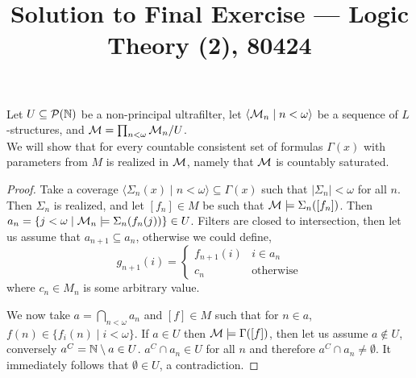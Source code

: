 
\title{Solution to Final Exercise --- Logic Theory (2), 80424}

\DeclareMathOperator{\PA}{PA}
\DeclareMathOperator{\Coll}{Coll}
\DeclareMathOperator{\Ind}{Ind}
\DeclareMathOperator{\Sat}{Sat}
\DeclareMathOperator{\pr}{Pr}
\DeclareMathOperator{\sent}{sent}
\DeclareMathOperator{\form}{form}
\DeclareMathOperator{\val}{Val}
\DeclareMathOperator{\sat}{Sat}
\DeclareMathOperator{\term}{term}
\DeclareMathOperator{\sk}{Sk}
\DeclareMathOperator{\FV}{FV}


\maketitle
\maketitleprint[yellow]

\question{}
\subquestion{}
Let $U \subseteq \mathcal{P}(\mathbb{N})$ be a non-principal ultrafilter, let $\langle \mathcal{M}_n \mid n < \omega \rangle$ be a sequence of $L$-structures, and $\mathcal{M} = \prod_{n < \omega} \mathcal{M}_n / U$. \\
We will show that for every countable consistent set of formulas $\Gamma(x)$ with parameters from $M$ is realized in $\mathcal{M}$, namely that $\mathcal{M}$ is countably saturated.
\begin{proof}
	Take a coverage $\langle \Sigma_n(x) \mid n < \omega \rangle \subseteq \Gamma(x)$ such that $|\Sigma_n| < \omega$ for all $n$.
	Then $\Sigma_n$ is realized, and let $[f_n] \in M$ be such that $\mathcal{M} \models \Sigma_n([f_n])$.
	Then $a_n = \{ j < \omega \mid \mathcal{M}_n \models \Sigma_n(f_n(j)) \} \in U$.
	Filters are closed to intersection, then let us assume that $a_{n + 1} \subseteq a_n$, otherwise we could define,
	\[
		g_{n + 1}(i) = \begin{cases}
			f_{n + 1}(i) & i \in a_n \\
			c_n & \text{otherwise}
		\end{cases}
	\]
	where $c_n \in M_n$ is some arbitrary value.

	We now take $a = \bigcap_{n < \omega} a_n$ and $[f] \in M$ such that for $n \in a$, $f(n) \in \{ f_i(n) \mid i < \omega \}$.
	If $a \in U$ then $\mathcal{M} \models \Gamma([f])$, then let us assume $a \notin U$, conversely $a^C = \mathbb{N} \setminus a \in U$.
	$a^C \cap a_n \in U$ for all $n$ and therefore $a^C \cap a_n \ne \emptyset$.
	It immediately follows that $\emptyset \in U$, a contradiction.
\end{proof}

